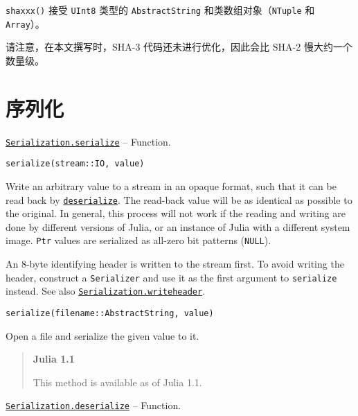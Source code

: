 \texttt{shaxxx()} 接受 \texttt{UInt8} 类型的 \texttt{AbstractString} 和类数组对象（\texttt{NTuple} 和 \texttt{Array}）。



请注意，在本文撰写时，SHA-3 代码还未进行优化，因此会比 SHA-2 慢大约一个数量级。



\hypertarget{13724487893001117879}{}


\chapter{序列化}


\hypertarget{17931089632175850899}{} 
\hyperlink{17931089632175850899}{\texttt{Serialization.serialize}}  -- {Function.}

\begin{adjustwidth}{2em}{0pt}


\begin{verbatim}
serialize(stream::IO, value)
\end{verbatim}

Write an arbitrary value to a stream in an opaque format, such that it can be read back by \hyperlink{5889257128684048834}{\texttt{deserialize}}. The read-back value will be as identical as possible to the original. In general, this process will not work if the reading and writing are done by different versions of Julia, or an instance of Julia with a different system image. \texttt{Ptr} values are serialized as all-zero bit patterns (\texttt{NULL}).

An 8-byte identifying header is written to the stream first. To avoid writing the header, construct a \texttt{Serializer} and use it as the first argument to \texttt{serialize} instead. See also \hyperlink{165660671771374050}{\texttt{Serialization.writeheader}}.




\begin{lstlisting}
serialize(filename::AbstractString, value)
\end{lstlisting}

Open a file and serialize the given value to it.

\begin{quote}
\textbf{Julia 1.1}

This method is available as of Julia 1.1.

\end{quote}


\end{adjustwidth}
\hypertarget{5889257128684048834}{} 
\hyperlink{5889257128684048834}{\texttt{Serialization.deserialize}}  -- {Function.}

